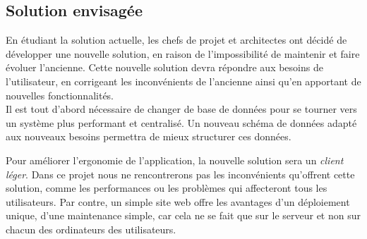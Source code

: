 \subsection{Solution envisagée}

En étudiant la solution actuelle, les chefs de projet et architectes ont décidé de développer une nouvelle solution, en raison de l'impossibilité de maintenir et faire évoluer l'ancienne.
Cette nouvelle solution devra répondre aux besoins de l'utilisateur, en corrigeant les inconvénients de l'ancienne ainsi qu'en apportant de nouvelles fonctionnalités.
\\

Il est tout d'abord nécessaire de changer de base de données pour se tourner vers un système plus performant et centralisé.
Un nouveau schéma de données adapté aux nouveaux besoins permettra de mieux structurer ces données.

Pour améliorer l'ergonomie de l'application, la nouvelle solution sera un \textit{client léger}.
Dans ce projet nous ne rencontrerons pas les inconvénients qu'offrent cette solution, comme les performances ou les problèmes qui affecteront tous les utilisateurs.
Par contre, un simple site web offre les avantages d'un déploiement unique, d'une maintenance simple, car cela ne se fait que sur le serveur et non sur chacun des ordinateurs des utilisateurs.